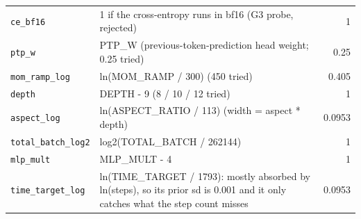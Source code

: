 {\begin{tabular}{@{}lp{10.6cm}r@{}}
\texttt{ce\_bf16} & 1 if the cross-entropy runs in bf16 (G3 probe, rejected) & 1 \\
\texttt{ptp\_w} & PTP\_W (previous-token-prediction head weight; 0.25 tried) & 0.25 \\
\texttt{mom\_ramp\_log} & ln(MOM\_RAMP / 300) (450 tried) & 0.405 \\
\texttt{depth} & DEPTH - 9 (8 / 10 / 12 tried) & 1 \\
\texttt{aspect\_log} & ln(ASPECT\_RATIO / 113) (width = aspect * depth) & 0.0953 \\
\texttt{total\_batch\_log2} & log2(TOTAL\_BATCH / 262144) & 1 \\
\texttt{mlp\_mult} & MLP\_MULT - 4 & 1 \\
\texttt{time\_target\_log} & ln(TIME\_TARGET / 1793): mostly absorbed by ln(steps), so its prior sd is 0.001 and it only catches what the step count misses & 0.0953 \\
\bottomrule
\end{tabular}
}

